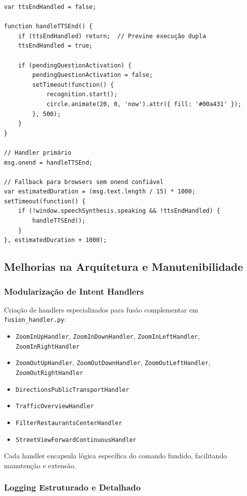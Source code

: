 \documentclass{report}
\begin{document}
\begin{verbatim}
var ttsEndHandled = false;

function handleTTSEnd() {
    if (ttsEndHandled) return;  // Previne execução dupla
    ttsEndHandled = true;

    if (pendingQuestionActivation) {
        pendingQuestionActivation = false;
        setTimeout(function() {
            recognition.start();
            circle.animate(20, 0, 'now').attr({ fill: '#00a431' });
        }, 500);
    }
}

// Handler primário
msg.onend = handleTTSEnd;

// Fallback para browsers sem onend confiável
var estimatedDuration = (msg.text.length / 15) * 1000;
setTimeout(function() {
    if (!window.speechSynthesis.speaking && !ttsEndHandled) {
        handleTTSEnd();
    }
}, estimatedDuration + 1000);
\end{verbatim}

\subsection{Melhorias na Arquitetura e Manutenibilidade}

\subsubsection{Modularização de Intent Handlers}

Criação de handlers especializados para fusão complementar em \texttt{fusion\_handler.py}:

\begin{itemize}
    \item \texttt{ZoomInUpHandler}, \texttt{ZoomInDownHandler}, \texttt{ZoomInLeftHandler}, \texttt{ZoomInRightHandler}
    \item \texttt{ZoomOutUpHandler}, \texttt{ZoomOutDownHandler}, \texttt{ZoomOutLeftHandler}, \texttt{ZoomOutRightHandler}
    \item \texttt{DirectionsPublicTransportHandler}
    \item \texttt{TrafficOverviewHandler}
    \item \texttt{FilterRestaurantsCenterHandler}
    \item \texttt{StreetViewForwardContinuousHandler}
\end{itemize}

Cada handler encapsula lógica específica do comando fundido, facilitando manutenção e extensão.

\subsubsection{Logging Estruturado e Detalhado}
\end{document}
